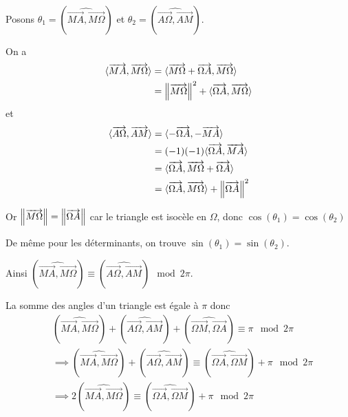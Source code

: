 \documentclass[a4paper,12pt]{article}
\begin{document}
\begin{demonstration}
    Posons $\theta_1 = (\widehat{\overrightarrow{MA}, \overrightarrow{M\Omega}})$
    et $\theta_2 = (\widehat{\overrightarrow{A \Omega}, \overrightarrow{A M}})$.

    On a
    \begin{align*}
        \langle\overrightarrow{MA}, \overrightarrow{M\Omega}\rangle &= \langle\overrightarrow{M\Omega} + \overrightarrow{\Omega A}, \overrightarrow{M\Omega}\rangle \\
        &= \left\lVert\overrightarrow{M\Omega}\right\rVert^2 + \langle\overrightarrow{\Omega A}, \overrightarrow{M\Omega}\rangle
    \end{align*}
    et
    \begin{align*}
        \langle\overrightarrow{A \Omega}, \overrightarrow{A M}\rangle &= \langle-\overrightarrow{\Omega A}, -\overrightarrow{M A}\rangle \\
        &= (-1)(-1)\langle\overrightarrow{\Omega A}, \overrightarrow{M A}\rangle \\
        &= \langle\overrightarrow{\Omega A}, \overrightarrow{M\Omega} + \overrightarrow{\Omega A}\rangle \\
        &= \langle\overrightarrow{\Omega A}, \overrightarrow{M\Omega}\rangle + \left\lVert\overrightarrow{\Omega A}\right\rVert^2
    \end{align*}

    Or $\left\lVert\overrightarrow{M\Omega}\right\rVert = \left\lVert\overrightarrow{\Omega A}\right\rVert$ car le triangle est isocèle en $\Omega$, donc $\cos(\theta_1) = \cos(\theta_2)$

    De même pour les déterminants, on trouve $\sin(\theta_1) = \sin(\theta_2)$.

    Ainsi $(\widehat{\overrightarrow{MA}, \overrightarrow{M\Omega}}) \equiv (\widehat{\overrightarrow{A \Omega}, \overrightarrow{A M}}) \mod 2\pi$.

    La somme des angles d'un triangle est égale à $\pi$ donc
    \begin{align*}  
        &(\widehat{\overrightarrow{M A}, \overrightarrow{M\Omega}}) + (\widehat{\overrightarrow{A \Omega}, \overrightarrow{A M}}) + (\widehat{\overrightarrow{\Omega M}, \overrightarrow{\Omega A}}) \equiv \pi \mod 2\pi \\
        &\implies (\widehat{\overrightarrow{M A}, \overrightarrow{M\Omega}}) + (\widehat{\overrightarrow{A \Omega}, \overrightarrow{A M}}) \equiv (\widehat{\overrightarrow{\Omega A}, \overrightarrow{\Omega M}}) + \pi \mod 2\pi \\
        &\implies 2(\widehat{\overrightarrow{M A}, \overrightarrow{M\Omega}}) \equiv (\widehat{\overrightarrow{\Omega A}, \overrightarrow{\Omega M}}) + \pi \mod 2\pi
    \end{align*}
\end{demonstration}
\end{document}
